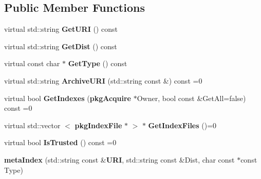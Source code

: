 \subsection*{\-Public \-Member \-Functions}
\begin{DoxyCompactItemize}
\item 
virtual std\-::string {\bfseries \-Get\-U\-R\-I} () const \label{classmetaIndex_ab02965a8c98b0219ca7bd3a200b8b8ac}

\item 
virtual std\-::string {\bfseries \-Get\-Dist} () const \label{classmetaIndex_a15c64bd46cc3c55b1ae40494eedd6cc3}

\item 
virtual const char $\ast$ {\bfseries \-Get\-Type} () const \label{classmetaIndex_a9b8127d5be6c2b62c764af5a34894341}

\item 
virtual std\-::string {\bfseries \-Archive\-U\-R\-I} (std\-::string const \&) const =0\label{classmetaIndex_a6f21698137b63df711ca0cb3ef7ddc0b}

\item 
virtual bool {\bfseries \-Get\-Indexes} ({\bf pkg\-Acquire} $\ast$\-Owner, bool const \&\-Get\-All=false) const =0\label{classmetaIndex_a050efd476876437401e49a7c9cfb5343}

\item 
virtual std\-::vector\*
$<$ {\bf pkg\-Index\-File} $\ast$ $>$ $\ast$ {\bfseries \-Get\-Index\-Files} ()=0\label{classmetaIndex_aa5c29b5235e5eefc4e6d1c4ec8323774}

\item 
virtual bool {\bfseries \-Is\-Trusted} () const =0\label{classmetaIndex_a34bb3919cf7cd2970bd504e870b0b0d5}

\item 
{\bfseries meta\-Index} (std\-::string const \&{\bf \-U\-R\-I}, std\-::string const \&\-Dist, char const $\ast$const \-Type)\label{classmetaIndex_a58c7d81dd6d67c231b1312ad58e18fbc}

\end{DoxyCompactItemize}
